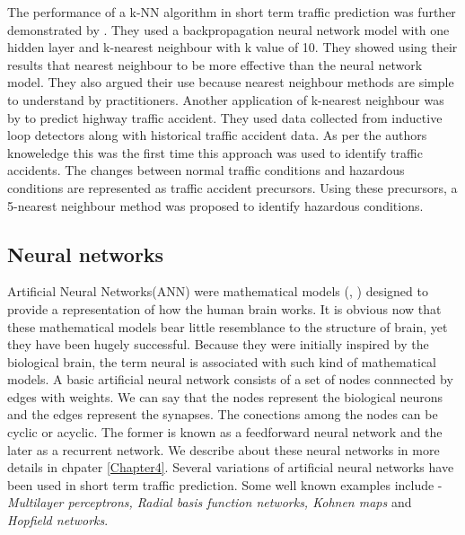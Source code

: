 The performance of a k-NN algorithm in short term traffic prediction was further demonstrated by
\citet{smith1994comparison}. They used a backpropagation neural network model with one hidden layer
and k-nearest neighbour with k value of 10. They showed using their results that nearest neighbour
to be more effective than the neural network model. They also argued their use because nearest
neighbour methods are simple to understand by practitioners. Another application of k-nearest neighbour
was by \citet{lv2009real} to predict highway traffic accident. They used data collected from
inductive loop detectors along with historical traffic accident data. As per the authors knoweledge
this was the first time this approach was used to identify traffic accidents. The changes between
normal traffic conditions and hazardous conditions are represented as traffic accident precursors.
Using these precursors, a 5-nearest neighbour method was proposed to identify hazardous conditions.


\subsection{Neural networks}
\label{subsec:neuralNetworksTrafficPred}
Artificial Neural Networks(ANN) were mathematical models (\citet{mcculloch1943logical},
\citet{rosenblatt1958perceptron}) designed to  provide a representation of how the human brain
works. It is obvious now that these mathematical models bear little resemblance to the structure
of brain, yet they have been hugely successful. Because they were initially inspired by the
biological brain, the term neural is associated with such kind of mathematical models. A basic
artificial neural network consists of a set of nodes connnected by edges with weights. We can say
that the nodes represent the biological neurons and the edges represent the synapses. The
conections among the nodes can be cyclic or acyclic. The former is known as a feedforward neural
network and the later as a recurrent network. We describe about these neural networks in more
details in chpater \ref{Chapter4}. Several variations of artificial neural networks have been
used in short term traffic prediction. Some well known examples include - \textit{Multilayer
perceptrons, Radial basis function networks, Kohnen maps} and \textit{Hopfield networks}.

